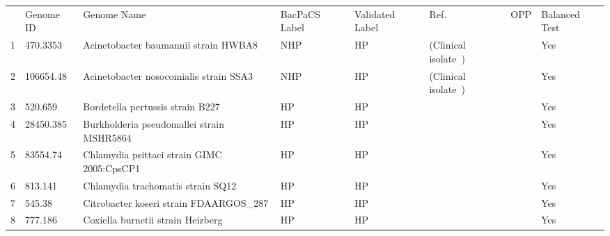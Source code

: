 \begin{tabular}{llllllll}

{} &   Genome ID &                                                       Genome Name & BacPaCS Label & Validated Label &                                                          Ref. &                              OPP & Balanced Test \\
1   &    470.3353 &                              Acinetobacter baumannii strain HWBA8 &           NHP &              HP &                         (Clinical isolate~\cite{yoon2017bla}) &    \cite{peleg2008acinetobacter} &           Yes \\
2   &   106654.48 &                            Acinetobacter nosocomialis strain SSA3 &           NHP &              HP &                         (Clinical isolate~\cite{yoon2017bla}) &    \cite{peleg2008acinetobacter} &           Yes \\
3   &     520.659 &                                  Bordetella pertussis strain B227 &            HP &              HP &                                       \cite{bowden2016genome} &                                  &           Yes \\
4   &   28450.385 &                         Burkholderia pseudomallei strain MSHR5864 &            HP &              HP &                                    \cite{sarovich2018raising} &       \cite{mangalea2017nitrate} &           Yes \\
5   &    83554.74 &                        Chlamydia psittaci strain GIMC 2005:CpsCP1 &            HP &              HP &                                      \cite{feodorova2020data} &                                  &           Yes \\
6   &     813.141 &                                 Chlamydia trachomatis strain SQ12 &            HP &              HP &                              \cite{suchland2017demonstration} &                                  &           Yes \\
7   &      545.38 &                           Citrobacter koseri strain FDAARGOS\_287 &            HP &              HP &                                                 \cite{545.38} &       \cite{yuan2019comparative} &           Yes \\
8   &     777.186 &                                 Coxiella burnetii strain Heizberg &            HP &              HP &                                        \cite{kuley2017genome} &                                  &           Yes \\

\end{tabular}
